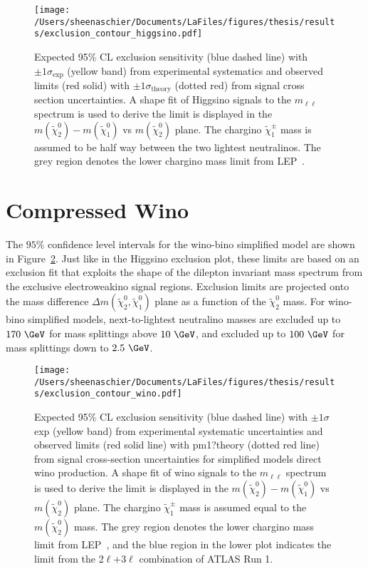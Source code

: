  \begin{figure}
 \centering
 \texttt{[image: /Users/sheenaschier/Documents/LaFiles/figures/thesis/results/exclusion\_contour\_higgsino.pdf]}
  \caption{
 Expected 95\% CL exclusion sensitivity (blue dashed line) with $\pm 1 \sigma_\text{exp}$ (yellow band) from experimental systematics
   and observed limits (red solid) with $\pm 1 \sigma_\text{theory}$ (dotted red) from signal cross section uncertainties.
A shape fit of Higgsino signals to the $m_{\ell\ell}$ spectrum is used to derive
 the limit is displayed in the $m(\tilde{\chi}^0_2) - m(\tilde{\chi}^0_1)$ vs $m(\tilde{\chi}^0_2)$ plane.
 The chargino $\tilde{\chi}^\pm_1$ mass is assumed to be half way between the two lightest neutralinos.
  The grey region denotes the lower chargino mass limit from LEP~\cite{LEPlimits}.}
   \label{fig:exclusion_contour_higgsino}
 \end{figure}
 
 \section{Compressed Wino}
 The $95\%$ confidence level intervals for the wino-bino simplified model are shown in Figure~\ref{fig:exclusion_contour_wino}.  Just like in the Higgsino exclusion plot, these limits are based on an exclusion fit that exploits the shape of the dilepton invariant mass spectrum from the exclusive electroweakino signal regions.  Exclusion limits are projected onto the mass difference $\Delta m(\tilde{\chi}^0_2, \tilde{\chi}^0_1)$ plane as a function of the $\tilde{\chi}^0_2$ mass.  For wino-bino simplified models, next-to-lightest neutralino masses are excluded up to $170~\GeV$ for mass splittings above $10~\GeV$, and excluded up to $100~\GeV$ for mass splittings down to $2.5~\GeV$. 
   \begin{figure}
 \centering
 \texttt{[image: /Users/sheenaschier/Documents/LaFiles/figures/thesis/results/exclusion\_contour\_wino.pdf]}
  \caption{Expected 95\% CL exclusion sensitivity (blue dashed line) with $\pm1\sigma$ exp (yellow band) from experimental systematic uncertainties and observed limits (red solid line) with pm1?theory (dotted red line) from signal cross-section uncertainties for simplified models direct wino production. 
  A shape fit of wino signals to the $m_{\ell\ell}$ spectrum is used to derive
 the limit is displayed in the $m(\tilde{\chi}^0_2) - m(\tilde{\chi}^0_1)$ vs $m(\tilde{\chi}^0_2)$ plane.
 The chargino $\tilde{\chi}^\pm_1$ mass is assumed equal to the $m(\tilde{\chi}^0_2)$ mass.
  The grey region denotes the lower chargino mass limit from LEP~\cite{LEPlimits}, and the blue region in the lower plot indicates the limit from the 2$\ell$+3$\ell$ combination of ATLAS Run 1.} 
     \label{fig:exclusion_contour_wino}
 \end{figure}
 
